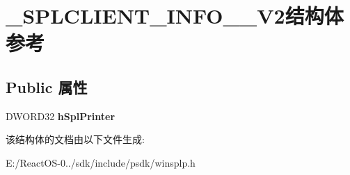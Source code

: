 \hypertarget{struct___s_p_l_c_l_i_e_n_t___i_n_f_o__2___v2}{}\section{\+\_\+\+S\+P\+L\+C\+L\+I\+E\+N\+T\+\_\+\+I\+N\+F\+O\+\_\+\_\+\+V2结构体 参考}
\label{struct___s_p_l_c_l_i_e_n_t___i_n_f_o__2___v2}
\subsection*{Public 属性}
\begin{DoxyCompactItemize}
\item 
\mbox{\label{struct___s_p_l_c_l_i_e_n_t___i_n_f_o__2___v2_a4cbba53af6531fec37c14f15c847364c}} 
D\+W\+O\+R\+D32 {\bfseries h\+Spl\+Printer}
\end{DoxyCompactItemize}


该结构体的文档由以下文件生成\+:\begin{DoxyCompactItemize}
\item 
E\+:/\+React\+O\+S-\/0../sdk/include/psdk/winsplp.\+h\end{DoxyCompactItemize}
